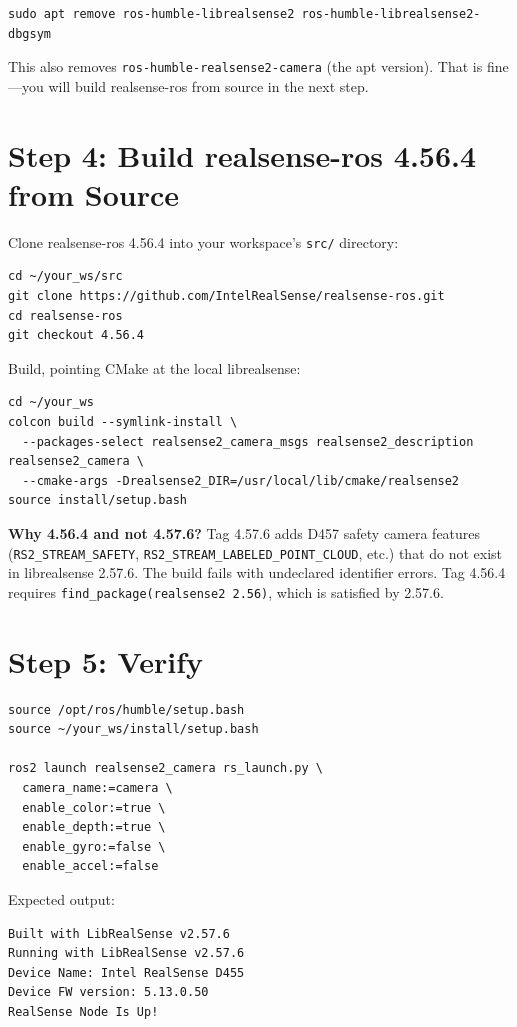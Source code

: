 \documentclass[11pt]{article}
\begin{document}
\begin{lstlisting}
sudo apt remove ros-humble-librealsense2 ros-humble-librealsense2-dbgsym
\end{lstlisting}

This also removes \texttt{ros-humble-realsense2-camera} (the apt version). That is fine---you will build realsense-ros from source in the next step.

\section{Step 4: Build realsense-ros 4.56.4 from Source}

Clone realsense-ros 4.56.4 into your workspace's \texttt{src/} directory:

\begin{lstlisting}
cd ~/your_ws/src
git clone https://github.com/IntelRealSense/realsense-ros.git
cd realsense-ros
git checkout 4.56.4
\end{lstlisting}

Build, pointing CMake at the local librealsense:

\begin{lstlisting}
cd ~/your_ws
colcon build --symlink-install \
  --packages-select realsense2_camera_msgs realsense2_description realsense2_camera \
  --cmake-args -Drealsense2_DIR=/usr/local/lib/cmake/realsense2
source install/setup.bash
\end{lstlisting}

\textbf{Why 4.56.4 and not 4.57.6?} Tag 4.57.6 adds D457 safety camera features (\texttt{RS2\_STREAM\_SAFETY}, \texttt{RS2\_STREAM\_LABELED\_POINT\_CLOUD}, etc.) that do not exist in librealsense 2.57.6. The build fails with undeclared identifier errors. Tag 4.56.4 requires \texttt{find\_package(realsense2 2.56)}, which is satisfied by 2.57.6.

\section{Step 5: Verify}

\begin{lstlisting}
source /opt/ros/humble/setup.bash
source ~/your_ws/install/setup.bash

ros2 launch realsense2_camera rs_launch.py \
  camera_name:=camera \
  enable_color:=true \
  enable_depth:=true \
  enable_gyro:=false \
  enable_accel:=false
\end{lstlisting}

Expected output:
\begin{lstlisting}
Built with LibRealSense v2.57.6
Running with LibRealSense v2.57.6
Device Name: Intel RealSense D455
Device FW version: 5.13.0.50
RealSense Node Is Up!
\end{lstlisting}
\end{document}
